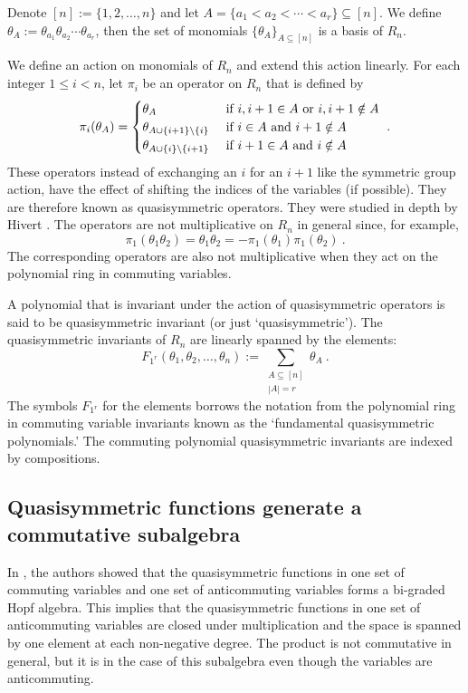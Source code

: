 \documentclass[submission]{FPSAC2023}
\theoremstyle{definition}
\numberwithin{equation}{section}
\begin{document}
Denote $[n] := \{1,2, \ldots,n\}$ and
let $A = \{a_1 < a_2 < \cdots < a_r \} \subseteq [n]$.
We define $\theta_A := \theta_{a_1} \theta_{a_2} \cdots \theta_{a_r}$,
then the set of monomials $\{ \theta_A \}_{A \subseteq [n]}$ is a basis of $R_n$.

We define an action on monomials of $R_n$ and extend this action linearly.
For each integer $1 \leq i < n$, let $\pi_i$ be an operator on $R_n$
that is defined by
\begin{equation}\label{eq:pi}
\pi_i(\theta_A) = \begin{cases}
\theta_{A} & \hbox{ if } i, i+1 \in A\hbox{ or }i, i+1 \notin A\\
\theta_{A \cup \{i+1\} \backslash \{i\}} & \hbox{ if } i\in A\hbox{ and }i+1 \notin A\\
\theta_{A \cup \{i\} \backslash \{i+1\}} & \hbox{ if } i+1\in A\hbox{ and }i \notin A
\end{cases}~.
\end{equation}
These operators instead of exchanging an $i$ for an $i+1$ like the symmetric group
action, have the effect of shifting the indices of the variables (if possible).  They
are therefore known as quasisymmetric operators.  They were studied in depth by
Hivert \cite{Hi}.  The operators are not multiplicative on $R_n$ in general since, for example,
\[
\pi_1( \theta_{1} \theta_{2})
= \theta_1 \theta_2
= - \pi_1( \theta_{1}) \pi_1(\theta_{2})~.
\]
The corresponding operators are also not multiplicative when they act on the polynomial ring
in commuting variables.

A polynomial that is invariant under the action of quasisymmetric operators
is said to be quasisymmetric invariant (or just `quasisymmetric').
The quasisymmetric invariants of $R_n$ are
linearly spanned by the elements:
\begin{equation}\label{eq:defF}
F_{1^r}(\theta_1, \theta_2, \ldots, \theta_n) := \sum_{\substack{A \subseteq [n]\\|A|=r}} \theta_A~.
\end{equation}
The symbols $F_{1^r}$ for the elements borrows the notation from the
polynomial ring in commuting variable invariants known as the `fundamental
quasisymmetric polynomials.'  The commuting polynomial quasisymmetric
invariants are indexed by compositions.

\subsection{Quasisymmetric functions generate a commutative subalgebra}
In \cite{FLP}, the authors showed that the quasisymmetric functions in
one set of commuting variables and one set of anticommuting variables
forms a bi-graded Hopf algebra.  This implies that the quasisymmetric functions
in one set of anticommuting variables are closed under multiplication
and the space is spanned by one element at each non-negative degree.
The product is not commutative in general, but it is in the case of this subalgebra
even though the variables are anticommuting.
\end{document}
